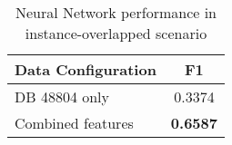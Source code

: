 \begin{table}[ht]
  \centering
  \caption{Neural Network performance in instance-overlapped scenario}
  \label{tab:vfl_neural_network_prediction_results}
  \begin{tabular}{lc}
  \toprule
  \textbf{Data Configuration} & \textbf{F1} \\
  \midrule
  DB 48804 only & 0.3374 \\
  Combined features & \textbf{0.6587} \\
  \bottomrule
  \end{tabular}
  \end{table}